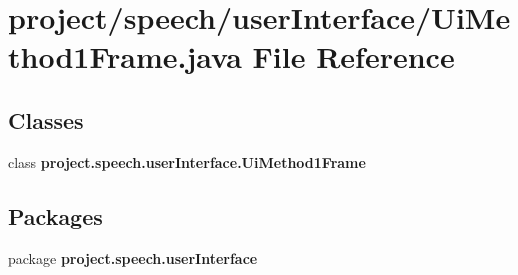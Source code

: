 \section{project/speech/user\+Interface/\+Ui\+Method1\+Frame.java File Reference}
\label{_ui_method1_frame_8java}
\subsection*{Classes}
\begin{DoxyCompactItemize}
\item 
class {\bf project.\+speech.\+user\+Interface.\+Ui\+Method1\+Frame}
\end{DoxyCompactItemize}
\subsection*{Packages}
\begin{DoxyCompactItemize}
\item 
package {\bf project.\+speech.\+user\+Interface}
\end{DoxyCompactItemize}
